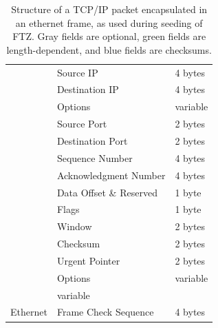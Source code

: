 \documentclass[twocolumn]{article}
\newcommand{\proj}{FTZ\xspace}
\begin{document}
\begin{table}
\begin{center}
\begin{tabular}{|l|l|l|}
                                    & Source IP                                  & 4 bytes                     \\\hhline{|~|-|-|}
                                    & Destination IP                             & 4 bytes                     \\\hhline{|~|-|-|}
                                    & \cellcolor{gray!20}Options                 & \cellcolor{gray!20}variable \\\hhline{|-|-|-|}
      \multirow{9}{4em}{TCP}        & Source Port                                & 2 bytes                     \\\hhline{|~|-|-|}
                                    & Destination Port                           & 2 bytes                     \\\hhline{|~|-|-|}
                                    & \cellcolor{green!10}Sequence Number        & \cellcolor{green!10}4 bytes \\\hhline{|~|-|-|}
                                    & \cellcolor{green!10}Acknowledgment Number  & \cellcolor{green!10}4 bytes \\\hhline{|~|-|-|}
                                    & Data Offset \& Reserved                    & 1 byte                      \\\hhline{|~|-|-|}
                                    & Flags                                      & 1 byte                      \\\hhline{|~|-|-|}
                                    & Window                                     & 2 bytes                     \\\hhline{|~|-|-|}
                                    & \cellcolor{blue!10}Checksum                & \cellcolor{blue!10}2 bytes  \\\hhline{|~|-|-|}
                                    & Urgent Pointer                             & 2 bytes                     \\\hhline{|~|-|-|}
                                    & \cellcolor{gray!20}Options                 & \cellcolor{gray!20}variable \\\hhline{|-|-|-|}
      \multicolumn{2}{|l|}{Payload} & variable                                                                 \\\hhline{|-|-|-|}
      Ethernet                      & \cellcolor{blue!10}Frame Check Sequence    & \cellcolor{blue!10}4 bytes  \\\hline
    \end{tabular}
    \caption{Structure of a TCP/IP packet encapsulated in an ethernet frame, as used during seeding of \proj. Gray fields are optional, green fields are length-dependent, and blue fields are checksums.}
    \label{tab:NetworkPacket}
  \end{center}
\end{table}
\end{document}
